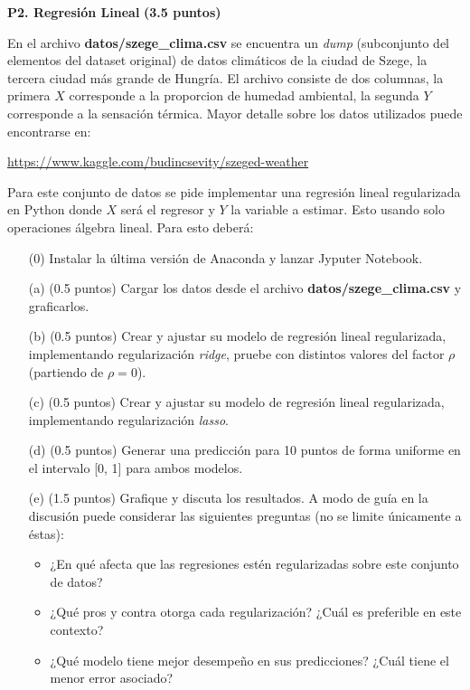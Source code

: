 \documentclass[11pt,letterpaper]{article}
\begin{document}
\vspace{5 mm}
\noindent\textbf{P2. Regresión Lineal} \textbf{(3.5 puntos)}
\vspace{5 mm}

En el archivo \textbf{datos/szege\_clima.csv} se encuentra un \emph{dump} (subconjunto del  elementos del dataset original) de datos climáticos de la ciudad de Szege, la tercera ciudad más grande de Hungría. El archivo consiste de dos columnas, la primera $X$ corresponde a la proporcion de humedad ambiental, la segunda $Y$ corresponde a la sensación térmica. Mayor detalle sobre los datos utilizados puede encontrarse en:

\vspace{1em}
\centerline{\url{https://www.kaggle.com/budincsevity/szeged-weather}}
\vspace{1em}

Para este conjunto de datos se pide implementar una regresión lineal regularizada en Python donde $X$ será el regresor y $Y$ la variable a estimar. Esto usando solo operaciones álgebra lineal.
Para esto deberá:
\begin{itemize}
	\item[(0)] Instalar la última versión de Anaconda y lanzar Jyputer Notebook.
	\item[(a)] (0.5 puntos) Cargar los datos desde el archivo \textbf{datos/szege\_clima.csv} y graficarlos.
	\item[(b)] (0.5 puntos) Crear y ajustar su modelo de regresión lineal regularizada, implementando regularización \emph{ridge}, pruebe con distintos valores del factor $\rho$ (partiendo de $\rho=0$).
	\item[(c)] (0.5 puntos) Crear y ajustar su modelo de regresión lineal regularizada, implementando regularización \emph{lasso}.
	\item[(d)] (0.5 puntos) Generar una predicción para 10 puntos de forma uniforme en el intervalo [0, 1] para ambos modelos.
	\item[(e)] (1.5 puntos) Grafique y discuta los resultados. A modo de guía en la discusión puede considerar las siguientes preguntas (no se limite únicamente a éstas):
	    \begin{itemize}
	        \item ¿En qué afecta que las regresiones estén regularizadas sobre este conjunto de datos?
	        \item ¿Qué pros y contra otorga cada regularización? ¿Cuál es preferible en este contexto?
	        \item ¿Qué modelo tiene mejor desempeño en sus predicciones? ¿Cuál tiene el menor error asociado?
	    \end{itemize}
\end{itemize}
\end{document}
